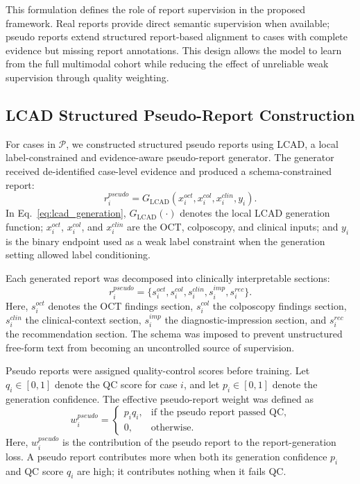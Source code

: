 This formulation defines the role of report supervision in the proposed framework. Real reports provide direct semantic supervision when available; pseudo reports extend structured report-based alignment to cases with complete evidence but missing report annotations. This design allows the model to learn from the full multimodal cohort while reducing the effect of unreliable weak supervision through quality weighting.

\subsection{LCAD Structured Pseudo-Report Construction}
\label{subsec:methods_lcad}

For cases in \(\mathcal{P}\), we constructed structured pseudo reports using LCAD, a local label-constrained and evidence-aware pseudo-report generator. The generator received de-identified case-level evidence and produced a schema-constrained report:
\begin{equation}
r_i^{pseudo}=G_{\mathrm{LCAD}}\left(x_i^{oct},x_i^{col},x_i^{clin},y_i\right).
\label{eq:lcad_generation}
\end{equation}
In Eq.~\eqref{eq:lcad_generation}, \(G_{\mathrm{LCAD}}(\cdot)\) denotes the local LCAD generation function; \(x_i^{oct}\), \(x_i^{col}\), and \(x_i^{clin}\) are the OCT, colposcopy, and clinical inputs; and \(y_i\) is the binary endpoint used as a weak label constraint when the generation setting allowed label conditioning.

Each generated report was decomposed into clinically interpretable sections:
\begin{equation}
r_i^{pseudo}=\{s_i^{oct},s_i^{col},s_i^{clin},s_i^{imp},s_i^{rec}\}.
\label{eq:report_sections}
\end{equation}
Here, \(s_i^{oct}\) denotes the OCT findings section, \(s_i^{col}\) the colposcopy findings section, \(s_i^{clin}\) the clinical-context section, \(s_i^{imp}\) the diagnostic-impression section, and \(s_i^{rec}\) the recommendation section. The schema was imposed to prevent unstructured free-form text from becoming an uncontrolled source of supervision.

Pseudo reports were assigned quality-control scores before training. Let \(q_i\in[0,1]\) denote the QC score for case \(i\), and let \(p_i\in[0,1]\) denote the generation confidence. The effective pseudo-report weight was defined as
\begin{equation}
w_i^{pseudo}=
\begin{cases}
p_iq_i, & \text{if the pseudo report passed QC},\\
0, & \text{otherwise}.
\end{cases}
\label{eq:pseudo_weight}
\end{equation}
Here, \(w_i^{pseudo}\) is the contribution of the pseudo report to the report-generation loss. A pseudo report contributes more when both its generation confidence \(p_i\) and QC score \(q_i\) are high; it contributes nothing when it fails QC.

